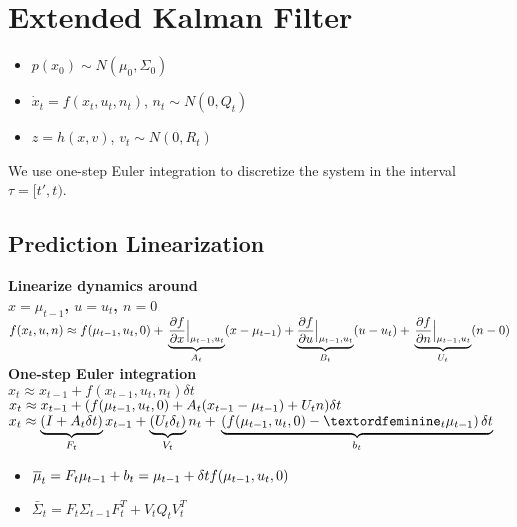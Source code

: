 \section{Extended Kalman Filter}
\begin{itemize}
  \item $p(x_0) \sim N(\mu_0, \Sigma_0)$
  \item $\dot{x}_t = f(x_t, u_t, n_t)$, $n_t\sim N(0, Q_t)$
  \item $z = h(x, v)$, $v_t \sim N(0, R_t)$
\end{itemize}

We use one-step Euler integration to discretize the system in the
interval $\tau = [t', t)$.

\subsection*{Prediction Linearization}
\textbf{Linearize dynamics around\\$x = \mu_{t-1}$, $u = u_t$, $n = 0$}\\
$f(x_t, u, n) \approx f(\mu_{t-1}, u_t, 0) +\\
\underbrace{\dfrac{\partial f}{\partial x}\Bigr|_{\substack{\mu_{t-1},
u_t}}}_{A_t}(x - \mu_{t-1}) + \underbrace{\dfrac{\partial f}{\partial u}\Bigr|_{\substack{\mu_{t-1},
u_t}}}_{B_t}(u - u_t) +\\
\underbrace{\dfrac{\partial f}{\partial n}\Bigr|_{\substack{\mu_{t-1},
u_t}}}_{U_t}(n - 0)
$\\

\textbf{One-step Euler integration}\\
$x_t \approx x_{t-1} + f(x_{t-1}, u_t, n_t) \delta t$\\
$x_t \approx x_{t-1} + (  f(\mu_{t-1}, u_t, 0) + \\
A_t (x_{t-1} - \mu_{t-1})  +  U_t n) \delta t$\\
$x_t \approx \underbrace{(I + A_t \delta t)}_{F_t} x_{t-1}
+ \underbrace{(U_t \delta_t)}_{V_t} n_t + \\
\underbrace{\left( f(\mu_{t-1}, u_t, 0) - ª_t \mu_{t-1}\right) \delta t}_{b_t}$
\begin{itemize}
  \item $\bar{\mu}_t = F_t \mu_{t-1} + b_t \\
    = \mu_{t-1} + \delta t f(\mu_{t-1}, u_t, 0)$
  \item $\bar{\Sigma}_t = F_t \Sigma_{t-1} F_t^T + V_t Q_t
    V_t^T$
\end{itemize}

